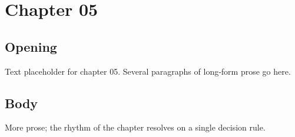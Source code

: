 \chapter{Chapter 05}
\section{Opening}
Text placeholder for chapter 05. Several paragraphs of long-form prose go here.
\section{Body}
More prose; the rhythm of the chapter resolves on a single decision rule.
